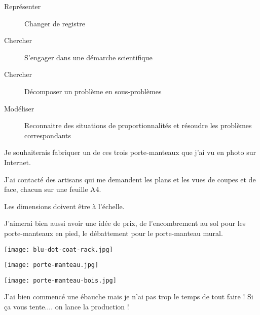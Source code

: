 \documentclass[openany]{book}
\begin{document}








\begin{seance}[Trigonométrie]

\begin{description}
\item[Représenter] Changer de registre 
\end{description}
\end{seance}




\begin{seance}[Trigonométrie]

\begin{description}
\item[Chercher] S'engager dans une démarche scientifique
\item[Chercher] Décomposer un problème en sous-problèmes
\item[Modéliser] Reconnaitre des situations de proportionnalités et résoudre les problèmes correspondants
\end{description}
\end{seance}

Je souhaiterais fabriquer un de ces trois porte-manteaux que j'ai vu en photo sur Internet. 

J'ai contacté des artisans qui me demandent les plans et les vues de coupes et de face, chacun sur une feuille A4. 

Les dimensions doivent être à l'échelle.

J'aimerai bien aussi avoir une idée de prix, de l'encombrement au sol pour les porte-manteaux en pied, le débattement  pour le porte-manteau mural.


\begin{minipage}{0.33\linewidth}
\texttt{[image: blu-dot-coat-rack.jpg]}  
\end{minipage}
\hfill
\begin{minipage}{0.33\linewidth}
\texttt{[image: porte-manteau.jpg]}
\end{minipage}
\hfill
\begin{minipage}{0.33\linewidth}
\texttt{[image: porte-manteau-bois.jpg]}
\end{minipage}

J'ai bien commencé une ébauche mais je n'ai pas trop le temps de tout faire ! Si ça vous tente.... on lance la production !
\end{document}
